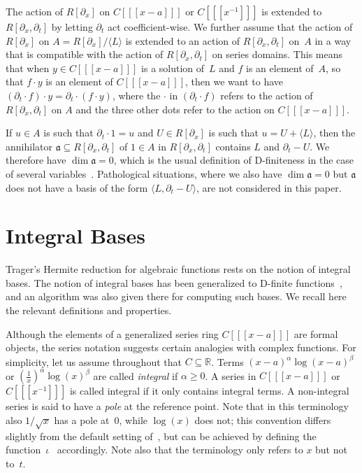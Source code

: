 \documentclass[final,1p,times,authoryear]{elsarticle}
\def\<#1>{\langle#1\rangle}
\let\set\mathbb
\begin{document}
The action of $R[\partial_x]$ on $C[[[x-a]]]$ or $C[[[x^{-1}]]]$ is extended
to $R[\partial_x,\partial_t]$ by letting $\partial_t$ act coefficient-wise.
We further assume that the action of $R[\partial_x]$ on $A=R[\partial_x]/\<L>$ is
extended to an action of $R[\partial_x,\partial_t]$ on~$A$ in a way that is
compatible with the action of $R[\partial_x,\partial_t]$ on series domains.
This means that when $y\in C[[[x-a]]]$ is a solution of~$L$ and $f$ is an
element of~$A$, so that $f\cdot y$ is an element of $C[[[x-a]]]$, then we
want to have $(\partial_t\cdot f)\cdot y=\partial_t\cdot(f\cdot y)$, where
the $\cdot$ in $(\partial_t\cdot f)$ refers to the action of $R[\partial_x,\partial_t]$
on $A$ and the three other dots refer to the action on $C[[[x-a]]]$.

If $u\in A$ is such that $\partial_t\cdot 1 = u$ and $U\in R[\partial_x]$ is such
that $u=U+\<L>$, then the annihilator $\mathfrak{a}\subseteq R[\partial_x,\partial_t]$
of $1\in A$ in $R[\partial_x,\partial_t]$ contains $L$ and $\partial_t-U$. We
therefore have $\dim\mathfrak{a}=0$, which is the usual
definition of D-finiteness in the case of several variables~\citep{Zeilberger1990,chyzak98,koutschan09,kauers14c}.
Pathological situations, where we also have $\dim\mathfrak{a}=0$ but 
$\mathfrak{a}$ does not have a basis of the form $\<L,\partial_t-U>$, are not
considered in this paper. 

\section{Integral Bases}

Trager's Hermite reduction for algebraic functions rests on the notion of
integral bases. The notion of integral bases has been generalized to D-finite
functions~\citep{kauers15b}, and an algorithm was also given there for
computing such bases. We recall here the relevant definitions and properties.

Although the elements of a generalized series ring $C[[[x-a]]]$ are formal
objects, the series notation suggests certain analogies with complex
functions.  For simplicity, let us assume throughout that $C\subseteq\set
R$. Terms $(x-a)^\alpha\log(x-a)^\beta$ or $(\tfrac1x)^\alpha\log(x)^\beta$ are
called \emph{integral} if $\alpha\geq0$. A series in
$C[[[x-a]]]$ or $C[[[x^{-1}]]]$ is called integral if it only contains integral
terms. A non-integral series is said to have a \emph{pole} at the reference
point. Note that in this terminology also $1/\sqrt{x}$ has a pole
at~$0$, while $\log(x)$ does not; this convention differs slightly from the
default setting of~\citep[Ex.~2]{kauers15b}, but can be achieved by defining
the function~$\iota$~\citep[Def.~1]{kauers15b} accordingly. Note also that
the terminology only refers to $x$ but not to~$t$.
\end{document}

